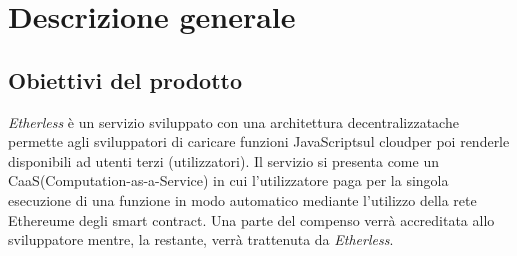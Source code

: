 \section{Descrizione generale}

\subsection{Obiettivi del prodotto}
\textit{Etherless} è un servizio sviluppato con una architettura decentralizzata\glo che permette agli sviluppatori di caricare funzioni JavaScript\glo sul cloud\glo per poi renderle disponibili ad utenti terzi (utilizzatori). Il servizio si presenta come un CaaS\glos (Computation-as-a-Service) in cui l’utilizzatore paga per la singola esecuzione di una funzione in modo automatico mediante l’utilizzo della rete Ethereum\glo e degli smart contract\glo. Una parte del compenso verrà accreditata allo sviluppatore mentre, la restante, verrà trattenuta da \textit{Etherless}.

